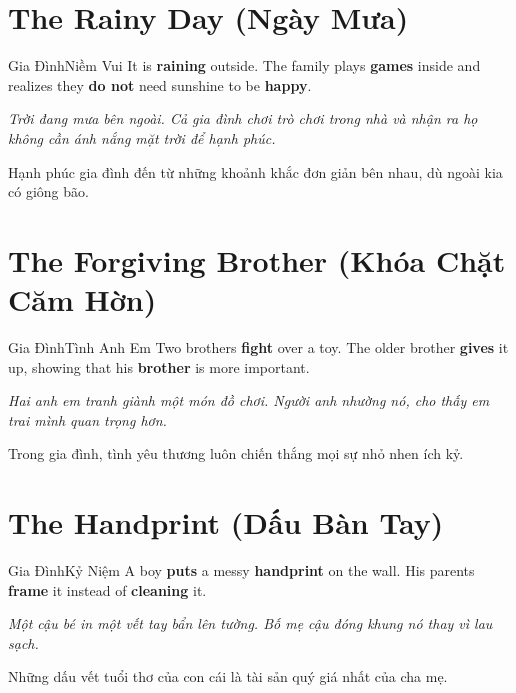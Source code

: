 \section{The Rainy Day (Ngày Mưa)}
\begin{truyen}{Gia Đình}{Niềm Vui}
It is \textbf{raining} outside. The family plays \textbf{games} inside and realizes they \textbf{do not} need sunshine to be \textbf{happy}.

\textit{Trời đang mưa bên ngoài. Cả gia đình chơi trò chơi trong nhà và nhận ra họ không cần ánh nắng mặt trời để hạnh phúc.}

\begin{baihoc}
Hạnh phúc gia đình đến từ những khoảnh khắc đơn giản bên nhau, dù ngoài kia có giông bão.
\end{baihoc}
\end{truyen}

\section{The Forgiving Brother (Khóa Chặt Căm Hờn)}
\begin{truyen}{Gia Đình}{Tình Anh Em}
Two brothers \textbf{fight} over a toy. The older brother \textbf{gives} it up, showing that his \textbf{brother} is more important.

\textit{Hai anh em tranh giành một món đồ chơi. Người anh nhường nó, cho thấy em trai mình quan trọng hơn.}

\begin{baihoc}
Trong gia đình, tình yêu thương luôn chiến thắng mọi sự nhỏ nhen ích kỷ.
\end{baihoc}
\end{truyen}

\section{The Handprint (Dấu Bàn Tay)}
\begin{truyen}{Gia Đình}{Kỷ Niệm}
A boy \textbf{puts} a messy \textbf{handprint} on the wall. His parents \textbf{frame} it instead of \textbf{cleaning} it.

\textit{Một cậu bé in một vết tay bẩn lên tường. Bố mẹ cậu đóng khung nó thay vì lau sạch.}

\begin{baihoc}
Những dấu vết tuổi thơ của con cái là tài sản quý giá nhất của cha mẹ.
\end{baihoc}
\end{truyen}

